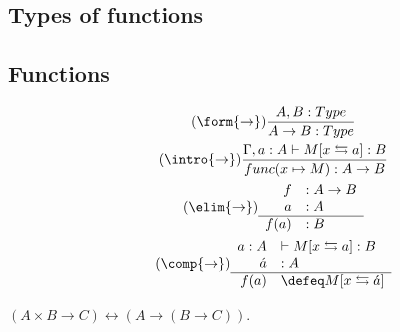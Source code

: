
\subsection{Types of functions}

\subsection{Functions}
\begin{gather}
    \tag{$\form{\to}$}
    \frac{A,B:Type}{A\to B:Type}\\
    \tag{$\intro{\to}$}
    \frac{
        \Gamma, a:A \vdash M[x\leftrightarrows a]:B
    }{
        func(x\mapsto M):A\to B
    }\\
    \tag{$\elim{\to}$}
    \begin{array}{rl}
        f&:A\to B\\
        a&:A\\
    \hline
        f(a)&:B
    \end{array}\\
    \tag{$\comp{\to}$}
    \begin{array}{rl}
        a:A&\vdash M[x\leftrightarrows a]:B\\
        \acute{a}&:A\\
    \hline
        f(a)&\defeq M[x\leftrightarrows \acute{a}]
    \end{array}
\end{gather}


\begin{theorem}
    $(A\times B\to C)\longleftrightarrow (A\to (B\to C))$.
\end{theorem}
